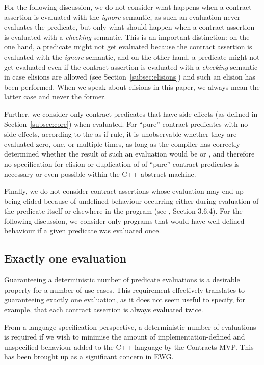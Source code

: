 For the following discussion, we do not consider what happens when a contract assertion is evaluated with the \emph{ignore} semantic, as such an evaluation never evaluates the predicate, but only what should happen when a contract assertion is evaluated with a \emph{checking} semantic. This is an important distinction: on the one hand, a predicate might not get evaluated because the contract assertion is evaluated with the \emph{ignore} semantic, and on the other hand, a predicate might not get evaluated even if the contract assertion is evaluated with a \emph{checking} semantic in case elisions are allowed (see Section~\ref{subsec:elisions}) and such an elision has been performed. When we speak about elisions in this paper, we always mean the latter case and never the former.

Further, we consider only contract predicates that have side effects (as defined in Section~\ref{subsec:core}) when evaluated. For ``pure'' contract predicates with no side effects, according to the as-if rule, it is unobservable whether they are evaluated zero, one, or multiple times, as long as the compiler has correctly determined whether the result of such an evaluation would be  or , and therefore no specification for elision or duplication of of ``pure'' contract predicates is necessary or even possible within the C++ abstract machine.

Finally, we do not consider contract assertions whose evaluation may end up being elided because of undefined behaviour occurring either during evaluation of the predicate itself or elsewhere in the program (see \cite{P2900R6}, Section 3.6.4). For the following discussion, we consider only programs that would have well-defined behaviour if a given predicate was evaluated once.

\subsection{Exactly one evaluation}
\label{subsec:exactlyonce}
Guaranteeing a deterministic number of predicate evaluations is a desirable property for a number of use cases. This requirement effectively translates to guaranteeing exactly one evaluation, as it does not seem useful to specify, for example, that each contract assertion is always evaluated twice.

From a language specification perspective, a deterministic number of evaluations is required if we wish to minimise the amount of implementation-defined and unspecified behaviour added to the C++ language by the Contracts MVP. This has been brought up as a significant concern in EWG.

